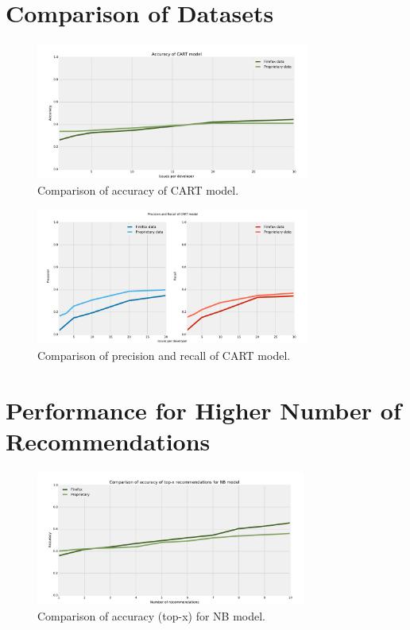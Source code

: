 \documentclass[nopalatino,nolot,nolof,color]{fithesis3}
\begin{document}
 \clearpage
 \section{Comparison of Datasets}

 \begin{figure}[htbp]
    \centering
        \includegraphics[width=340px]{./images/prop_vs_os/cart_accuracy.pdf}
    \caption{Comparison of accuracy of CART model.}
    \label{fig:results.datasets.cart_accuracy}
 \end{figure}

 \begin{figure}[htbp]
    \centering
        \includegraphics[width=340px]{./images/prop_vs_os/cart_precision_and_recall.pdf}
    \caption{Comparison of precision and recall of CART model.}
    \label{fig:results.datasets.cart_pr}
 \end{figure}

 \clearpage
 \section{Performance for Higher Number of Recommendations}

 \begin{figure}[htbp]
    \centering
        \includegraphics[width=335px]{./images/top_x_comparison/nb_accuracy.pdf}
    \caption{Comparison of accuracy (top-x) for NB model.}
    \label{fig:results.topx.nb_accuracy}
 \end{figure}
\end{document}
